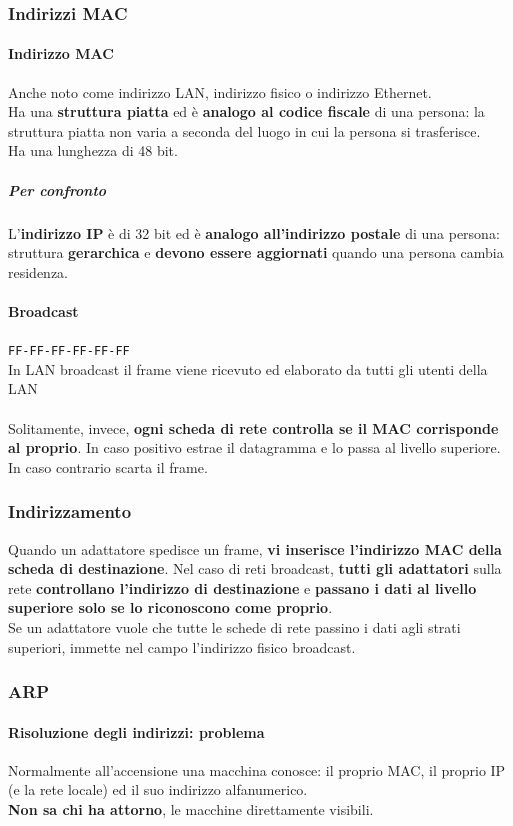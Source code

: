 \documentclass[10pt]{article}
\begin{document}
\subsubsection{Indirizzi MAC}
\paragraph{Indirizzo MAC} Anche noto come indirizzo LAN, indirizzo fisico o indirizzo Ethernet.\\
Ha una \textbf{struttura piatta} ed è \textbf{analogo al codice fiscale} di una persona: la struttura piatta non varia a seconda del luogo in cui la persona si trasferisce.\\
Ha una lunghezza di 48 bit.
\subparagraph{Per confronto} L'\textbf{indirizzo IP} è di 32 bit ed è \textbf{analogo all'indirizzo postale} di una persona: struttura \textbf{gerarchica} e \textbf{devono essere aggiornati} quando una persona cambia residenza.
\paragraph{Broadcast} \texttt{FF-FF-FF-FF-FF-FF}\\
In LAN broadcast il frame viene ricevuto ed elaborato da tutti gli utenti della LAN\\\\
Solitamente, invece, \textbf{ogni scheda di rete controlla se il MAC corrisponde al proprio}. In caso positivo estrae il datagramma e lo passa al livello superiore.\\
In caso contrario scarta il frame.
\subsubsection{Indirizzamento} Quando un adattatore spedisce un frame, \textbf{vi inserisce l'indirizzo MAC della scheda di destinazione}. Nel caso di reti broadcast, \textbf{tutti gli adattatori} sulla rete \textbf{controllano l'indirizzo di destinazione} e \textbf{passano i dati al livello superiore solo se lo riconoscono come proprio}.\\
Se un adattatore vuole che tutte le schede di rete passino i dati agli strati superiori, immette nel campo l'indirizzo fisico broadcast.
\subsubsection{ARP}
\paragraph{Risoluzione degli indirizzi: problema} Normalmente all'accensione una macchina conosce: il proprio MAC, il proprio IP (e la rete locale) ed il suo indirizzo alfanumerico.\\
\textbf{Non sa chi ha attorno}, le macchine direttamente visibili.
\end{document}
